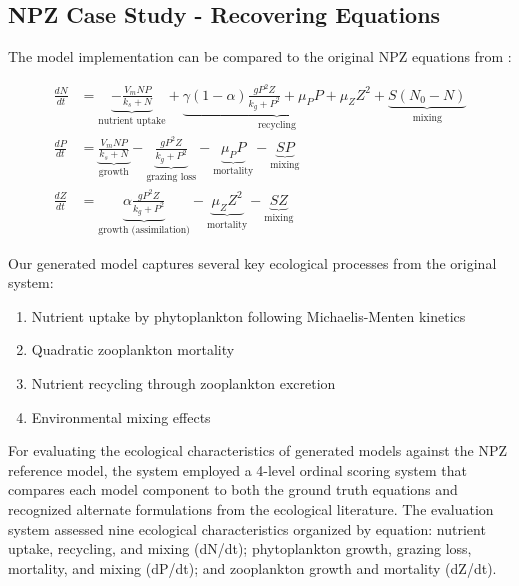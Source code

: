 \setcounter{section}{0}
\renewcommand{\thesection}{S\arabic{section}}



\subsection{NPZ Case Study - Recovering Equations}
\label{subsec:npz_evaluation_prompt}

The model implementation can be compared to the original NPZ equations from \cite{edwards1999zooplankton}:

\begin{align*}
    \frac{dN}{dt} &= \underbrace{-\frac{V_m N P}{k_s + N}}_{\text{nutrient uptake}}
                   + \underbrace{\gamma(1-\alpha)\frac{g P^2 Z}{k_g + P^2} + \mu_P P + \mu_Z Z^2}_{\text{recycling}}
                   + \underbrace{S(N_0 - N)}_{\text{mixing}} \\[6pt]
    \frac{dP}{dt} &= \underbrace{\frac{V_m N P}{k_s + N}}_{\text{growth}}
                   - \underbrace{\frac{g P^2 Z}{k_g + P^2}}_{\text{grazing loss}}
                   - \underbrace{\mu_P P}_{\text{mortality}}
                   - \underbrace{S P}_{\text{mixing}} \\[6pt]
    \frac{dZ}{dt} &= \underbrace{\alpha\frac{g P^2 Z}{k_g + P^2}}_{\text{growth (assimilation)}}
                   - \underbrace{\mu_Z Z^2}_{\text{mortality}}
                   - \underbrace{S Z}_{\text{mixing}}
    \end{align*}

Our generated model captures several key ecological processes from the original system:
\begin{enumerate}
\item Nutrient uptake by phytoplankton following Michaelis-Menten kinetics
\item Quadratic zooplankton mortality
\item Nutrient recycling through zooplankton excretion
\item Environmental mixing effects
\end{enumerate}

For evaluating the ecological characteristics of generated models against the NPZ reference model, the system employed a 4-level ordinal scoring system that compares each model component to both the ground truth equations and recognized alternate formulations from the ecological literature. The evaluation system assessed nine ecological characteristics organized by equation: nutrient uptake, recycling, and mixing (dN/dt); phytoplankton growth, grazing loss, mortality, and mixing (dP/dt); and zooplankton growth and mortality (dZ/dt).

